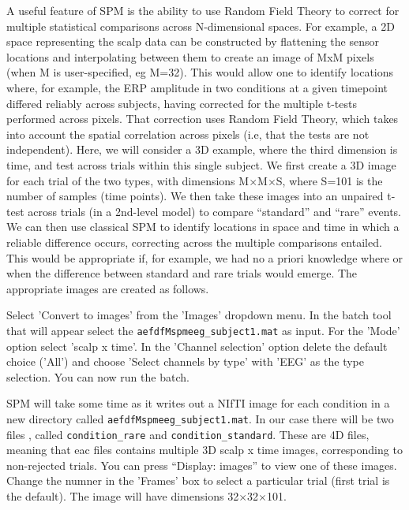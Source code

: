 A useful feature of SPM is the ability to use Random Field Theory to correct for multiple statistical comparisons across N-dimensional spaces. For example, a 2D space representing the scalp data can be constructed by flattening the sensor locations and interpolating between them to create an image of MxM pixels (when M is user-specified, eg M=32). This would allow one to identify locations where, for example, the ERP amplitude in two conditions at a given timepoint differed reliably across subjects, having corrected for the multiple t-tests performed across pixels. That correction uses Random Field Theory, which takes into account the spatial correlation across pixels (i.e, that the tests are not independent).
Here, we will consider a 3D example, where the third dimension is time, and test across trials within this single subject. We first create a 3D image for each trial of the two types, with dimensions M$\times$M$\times$S, where S=101 is the number of samples (time points). We then take these images into an unpaired t-test across trials (in a 2nd-level model) to compare ``standard'' and ``rare'' events. We can then use classical SPM to identify locations in space and time in which a reliable difference occurs, correcting across the multiple comparisons entailed. This would be appropriate if, for example, we had no a priori knowledge where or when the difference between standard and rare trials would emerge. The appropriate images are created as follows.

Select 'Convert to images' from the 'Images' dropdown menu. In the batch tool that will appear select the  \texttt{aefdfMspmeeg\_subject1.mat} as input. For the 'Mode' option select 'scalp x time'.  In the 'Channel selection' option delete the default choice ('All') and choose 'Select channels by type' with 'EEG' as the type selection. You can now run the batch.

SPM will take some time as it writes out a NIfTI image for each condition in a new directory called \texttt{aefdfMspmeeg\_subject1.mat}. In our case there will be two files ,  called \texttt{condition\_rare} and \texttt{condition\_standard}. These are 4D files, meaning that eac files contains multiple 3D scalp x time images, corresponding to non-rejected trials. You can press ``Display: images'' to view one of these images. Change the numner in the 'Frames' box to select a particular trial  (first trial is the default). The image will have dimensions 32$\times$32$\times$101.

